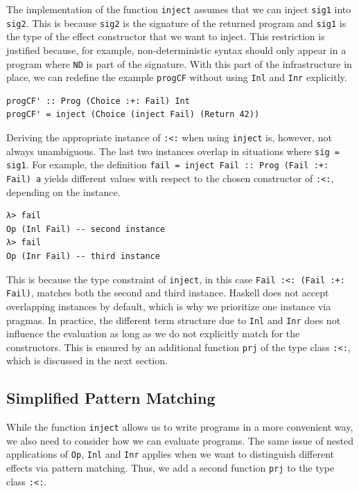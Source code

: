 \documentclass[a4paper, 11pt, fleqn, twoside, abstract=on]{scrreprt}
\newcommand{\hinl}[1]{\texttt{#1}}
\begin{document}
The implementation of the function \hinl{inject} assumes that we can inject \hinl{sig1} into \hinl{sig2}.
This is because \hinl{sig2} is the signature of the returned program and \hinl{sig1} is the type of the effect constructor that we want to inject.
This restriction is justified because, for example, non-deterministic syntax should only appear in a program where \hinl{ND} is part of the signature.
With this part of the infrastructure in place, we can redefine the example \hinl{progCF} without using \hinl{Inl} and \hinl{Inr} explicitly.

\begin{verbatim}
progCF' :: Prog (Choice :+: Fail) Int
progCF' = inject (Choice (inject Fail) (Return 42))
\end{verbatim}

Deriving the appropriate instance of \hinl{:<:} when using \hinl{inject} is, however, not always unambiguous.
The last two instances overlap in situations where \hinl{sig = sig1}.
For example, the definition \hinl{fail = inject Fail :: Prog (Fail :+: Fail) a} yields different values with respect to the chosen constructor of \hinl{:<:}, depending on the instance.

\begin{verbatim}
λ> fail
Op (Inl Fail) -- second instance
λ> fail
Op (Inr Fail) -- third instance
\end{verbatim}

This is because the type constraint of \hinl{inject}, in this case \hinl{Fail :<: (Fail :+: Fail)}, matches both the second and third instance.
Haskell does not accept overlapping instances by default, which is why we prioritize one instance via pragmas.
In practice, the different term structure due to \hinl{Inl} and \hinl{Inr} does not influence the evaluation as long as we do not explicitly match for the constructors.
This is ensured by an additional function \hinl{prj} of the type class \hinl{:<:}, which is discussed in the next section.

\subsection{Simplified Pattern Matching}
While the function \hinl{inject} allows us to write programs in a more convenient way, we also need to consider how we can evaluate programs.
The same issue of nested applications of \hinl{Op}, \hinl{Inl} and \hinl{Inr} applies when we want to distinguish different effects via pattern matching.
Thus, we add a second function \hinl{prj} to the type class \hinl{:<:}.
\end{document}
